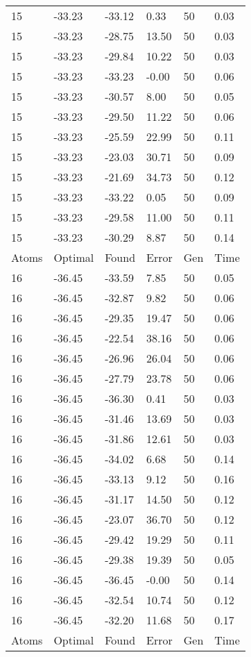 \documentclass{report}
\begin{document}
\begin{appendix}
\begin{longtable}{llllll}
15 & -33.23 & -33.12 & 0.33 & 50 & 0.03 \\
15 & -33.23 & -28.75 & 13.50 & 50 & 0.03 \\
15 & -33.23 & -29.84 & 10.22 & 50 & 0.03 \\
15 & -33.23 & -33.23 & -0.00 & 50 & 0.06 \\
15 & -33.23 & -30.57 & 8.00 & 50 & 0.05 \\
15 & -33.23 & -29.50 & 11.22 & 50 & 0.06 \\
15 & -33.23 & -25.59 & 22.99 & 50 & 0.11 \\
15 & -33.23 & -23.03 & 30.71 & 50 & 0.09 \\
15 & -33.23 & -21.69 & 34.73 & 50 & 0.12 \\
15 & -33.23 & -33.22 & 0.05 & 50 & 0.09 \\
15 & -33.23 & -29.58 & 11.00 & 50 & 0.11 \\
15 & -33.23 & -30.29 & 8.87 & 50 & 0.14 \\
Atoms & Optimal & Found & Error & Gen & Time \\
16 & -36.45 & -33.59 & 7.85 & 50 & 0.05 \\
16 & -36.45 & -32.87 & 9.82 & 50 & 0.06 \\
16 & -36.45 & -29.35 & 19.47 & 50 & 0.06 \\
16 & -36.45 & -22.54 & 38.16 & 50 & 0.06 \\
16 & -36.45 & -26.96 & 26.04 & 50 & 0.06 \\
16 & -36.45 & -27.79 & 23.78 & 50 & 0.06 \\
16 & -36.45 & -36.30 & 0.41 & 50 & 0.03 \\
16 & -36.45 & -31.46 & 13.69 & 50 & 0.03 \\
16 & -36.45 & -31.86 & 12.61 & 50 & 0.03 \\
16 & -36.45 & -34.02 & 6.68 & 50 & 0.14 \\
16 & -36.45 & -33.13 & 9.12 & 50 & 0.16 \\
16 & -36.45 & -31.17 & 14.50 & 50 & 0.12 \\
16 & -36.45 & -23.07 & 36.70 & 50 & 0.12 \\
16 & -36.45 & -29.42 & 19.29 & 50 & 0.11 \\
16 & -36.45 & -29.38 & 19.39 & 50 & 0.05 \\
16 & -36.45 & -36.45 & -0.00 & 50 & 0.14 \\
16 & -36.45 & -32.54 & 10.74 & 50 & 0.12 \\
16 & -36.45 & -32.20 & 11.68 & 50 & 0.17 \\
Atoms & Optimal & Found & Error & Gen & Time \\

\end{longtable}
\end{appendix}
\end{document}
